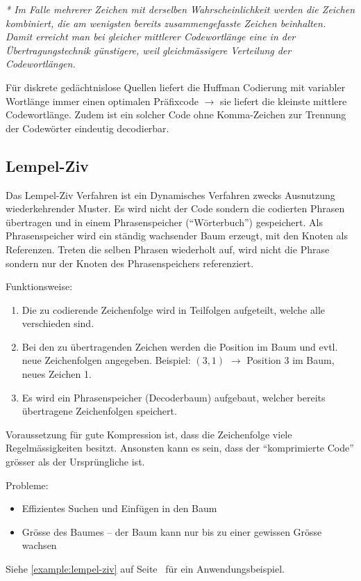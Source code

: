 \textit{* Im Falle mehrerer Zeichen mit derselben Wahrscheinlichkeit werden die
Zeichen kombiniert, die am wenigsten bereits zusammengefasste Zeichen
beinhalten. Damit erreicht man bei gleicher mittlerer Codewortlänge eine in
der Übertragungstechnik günstigere, weil gleichmässigere Verteilung der
Codewortlängen.}

Für diskrete gedächtnislose Quellen liefert die Huffman Codierung mit variabler
Wortlänge immer einen optimalen Präfixcode $\rightarrow$ sie liefert die
kleinste mittlere Codewortlänge. Zudem ist ein solcher Code ohne Komma-Zeichen
zur Trennung der Codewörter eindeutig decodierbar.


\subsection{Lempel-Ziv}

Das Lempel-Ziv Verfahren ist ein Dynamisches Verfahren zwecks Ausnutzung
wiederkehrender Muster. Es wird nicht der Code sondern die codierten Phrasen
übertragen und in einem Phrasenspeicher (``Wörterbuch'') gespeichert. Als
Phrasenspeicher wird ein ständig wachsender Baum erzeugt, mit den Knoten als
Referenzen. Treten die selben Phrasen wiederholt auf, wird nicht die Phrase
sondern nur der Knoten des Phrasenspeichers referenziert.

Funktionsweise:

\begin{enumerate}
	\item Die zu codierende Zeichenfolge wird in Teilfolgen aufgeteilt, welche
		alle verschieden sind.
	\item Bei den zu übertragenden Zeichen werden die Position im Baum und evtl.
		neue Zeichenfolgen angegeben. Beispiel: $(3,1)$ $\rightarrow$ Position 3 im
		Baum, neues Zeichen 1.
	\item Es wird ein Phrasenspeicher (Decoderbaum) aufgebaut, welcher bereits
		übertragene Zeichenfolgen speichert.
\end{enumerate}

Voraussetzung für gute Kompression ist, dass die Zeichenfolge viele
Regelmässigkeiten besitzt. Ansonsten kann es sein, dass der ``komprimierte
Code'' grösser als der Ursprüngliche ist.

Probleme:
\begin{itemize}
	\item Effizientes Suchen und Einfügen in den Baum
	\item Grösse des Baumes -- der Baum kann nur bis zu einer gewissen Grösse wachsen
\end{itemize}

Siehe \autoref{example:lempel-ziv} auf Seite~\pageref{example:lempel-ziv}
für ein Anwendungsbeispiel.
